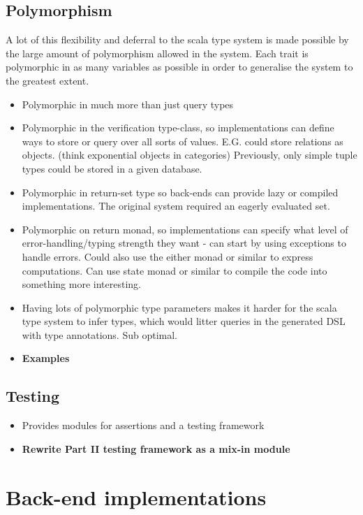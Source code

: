 \documentclass{report}
\newcommand \2[0]{\textbf{2}}
\newcommand \3[0]{\textbf{3}}
\newcommand{\todo}[1]{\textbf{#1}}
\begin{document}
\section{Polymorphism}
A lot of this flexibility and deferral to the scala type system is made possible by the large amount of polymorphism allowed in the system. Each trait is polymorphic in as many variables as possible in order to generalise the system to the greatest extent.
\begin{itemize}
    \item Polymorphic in much more than just query types
    \item Polymorphic in the verification type-class, so implementations can define ways to store or query over all sorts of values. E.G. could store relations as objects. (think exponential objects in categories) Previously, only simple tuple types could be stored in a given database.
    \item Polymorphic in return-set type so back-ends can provide lazy or compiled implementations. The original system required an eagerly evaluated set.
    \item Polymorphic on return monad, so implementations can specify what level of error-handling/typing strength they want - can start by using exceptions to handle errors. Could also use the either monad or similar to express computations. Can use state monad or similar to compile the code into something more interesting.
    \item Having lots of polymorphic type parameters makes it harder for the scala type system to infer types, which would litter queries in the generated DSL with type annotations. Sub optimal.
    \item\todo{Examples}
\end{itemize}

\section{Testing}
\begin{itemize}
    \item Provides modules for assertions and a testing framework
    \item \todo{Rewrite Part II testing framework as a mix-in module}
\end{itemize}

\chapter{Back-end implementations}
\end{document}
